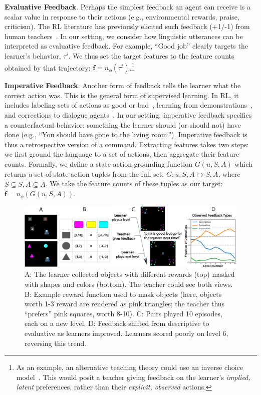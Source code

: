 \documentclass[letterpaper]{article} %
\begin{document}
\textbf{Evaluative Feedback}. Perhaps the simplest feedback an agent can receive is a scalar value in response to their actions (e.g., environmental rewards, praise, criticism). The RL literature has previously elicited such feedback (+1/-1) from human teachers~\citep{thomaz2008teachable, Knox2009Interactively, macglashan2017interactive}. In our setting, we consider how linguistic utterances can be interpreted as evaluative feedback. For example, ``Good job'' clearly targets the learner's behavior, $\tau^i$. We thus set the target features to the feature counts obtained by that trajectory: $\mathbf{f} = n_\phi(\tau^i)$.\footnote{As an example, an alternative teaching theory could use an inverse choice model~\citep{mcfadden1974conditional}. This would posit a teacher giving feedback on the learner's \textit{implied, latent} preferences, rather than their \textit{explicit, observed} actions.}

\textbf{Imperative Feedback}. Another form of feedback tells the learner what the correct action was. This is the general form of supervised learning. In RL, it includes labeling sets of actions as good or bad~\citep{judah2010_critique, christiano2017deep}, learning from demonstrations~\citep{ross2010efficient, abbeel2004apprenticeship, ho2016showing}, and corrections to dialogue agents~\citep{li2016dialogue, chen-etal-2017-line}. In our setting, imperative feedback specifies a counterfactual behavior: something the learner should (or should not) have done (e.g., ``You should have gone to the living room.''). Imperative feedback is thus a retrospective version of a command. Extracting features takes two steps: we first ground the language to a set of actions, then aggregate their feature counts. Formally, we define a state-action grounding function $G(u, S, A)$ which returns a set of state-action tuples from the full set: $G: u, S, A \mapsto \tilde{S}, \tilde{A}$, where $\tilde{S} \subseteq S, \tilde{A} \subseteq A$. We take the feature counts of these tuples as our target: $\textbf{f} = n_\phi(G(u, S, A))$.

\begin{figure}[h!]
\begin{center}
\includegraphics[width=17.5cm]{images/task_aaai.pdf}
\end{center}
\caption{A: The learner collected objects with different rewards (top) masked with shapes and colors (bottom). The teacher could see both views. B: Example reward function used to mask objects (here, objects worth 1-3 reward are rendered as pink triangles; the teacher thus ``prefers'' pink squares, worth 8-10). C: Pairs played 10 episodes, each on a new level. D: Feedback shifted from descriptive to evaluative as learners improved. Learners scored poorly on level 6, reversing this trend.} 
\label{task_ui}
\end{figure}
\end{document}
